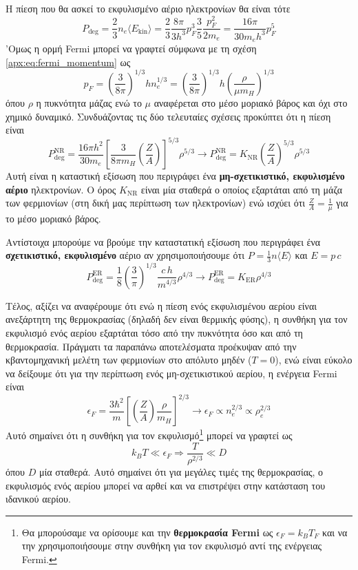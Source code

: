 Η πίεση που θα ασκεί το εκφυλισμένο αέριο ηλεκτρονίων θα είναι τότε
$$P_{\text{deg}} = \frac{2}{3} n_e \langle E_{\text{kin}} \rangle  = \frac{2}{3} \frac{8\pi}{3h^3} p_F^3 \frac{3}{5}\frac{p_F^2}{2m_e} = \frac{16\pi}{30m_e h^3}p_F^5$$
'Ομως η ορμή Fermi μπορεί να γραφτεί σύμφωνα με τη σχέση \eqref{apx:eq:fermi_momentum} ως
$$p_F = \left( \frac{3}{8\pi} \right)^{1/3} h n_e^{1/3} = \left(\frac{3}{8\pi} \right)^{1/3} h \left(\frac{\rho}{\mu m_H} \right)^{1/3}$$
όπου $\rho$ η πυκνότητα μάζας ενώ το $\mu$ αναφέρεται στο μέσο μοριακό βάρος και όχι στο χημικό δυναμικό. Συνδυάζοντας τις δύο τελευταίες σχέσεις προκύπτει ότι η πίεση είναι
\begin{equation}
    \label{apx:eq:degenerate_eos_nr}
    \boxed{P_{\text{deg}}^{\text{NR}} = \frac{16 \pi h^2}{30m_e} \left[ \frac{3}{8\pi m_H} \left(\frac{Z}{A} \right) \right]^{5/3} \rho^{5/3} \longrightarrow P_{\text{deg}}^{\text{NR}} = K_{\text{NR}} \left( \frac{Z}{A} \right)^{5/3} \rho^{5/3}}
\end{equation}
Αυτή είναι η καταστική εξίσωση που περιγράφει ένα \textbf{μη-σχετικιστικό, εκφυλισμένο αέριο} ηλεκτρονίων. Ο όρος $K_{\text{NR}}$ είναι μία σταθερά ο οποίος εξαρτάται από τη μάζα των φερμιονίων (στη δική μας περίπτωση των ηλεκτρονίων) ενώ ισχύει ότι $\frac{Z}{A} = \frac{1}{\mu}$ για το μέσο μοριακό βάρος.

Αντίστοιχα μπορούμε να βρούμε την καταστατική εξίσωση που περιγράφει ένα \textbf{σχετικιστικό, εκφυλισμένο} αέριο αν χρησιμοποιήσουμε ότι $P = \frac{1}{3}n \langle E \rangle$ και $E = p\,c$
\begin{equation}
    \label{apx:eq:degenerate_eos_er}
    \boxed{P_{\text{deg}}^{\text{ER}} = \frac{1}{8} \left( \frac{3}{\pi} \right)^{1/3} \frac{c\,h}{m^{4/3}} \rho^{4/3} \longrightarrow P_{\text{deg}}^{\text{ER}} = K_{\text{ER}} \rho^{4/3}}
\end{equation}

Τέλος, αξίζει να αναφέρουμε ότι ενώ η πίεση ενός εκφυλισμένου αερίου είναι ανεξάρτητη της θερμοκρασίας (δηλαδή δεν είναι θερμικής φύσης), η συνθήκη για τον εκφυλισμό ενός αερίου εξαρτάται τόσο από την πυκνότητα όσο και από τη θερμοκρασία. Πράγματι τα παραπάνω αποτελέσματα προέκυψαν από την κβαντομηχανική μελέτη των φερμιονίων στο απόλυτο μηδέν ($Τ=0$), ενώ είναι εύκολο να δείξουμε ότι για την περίπτωση ενός μη-σχετικιστικού αερίου, η ενέργεια Fermi είναι
$$\epsilon_F = \frac{3\hbar^2}{m} \left[\left( \frac{Z}{A} \right) \frac{\rho}{m_H} \right]^{2/3} \longrightarrow \epsilon_F \propto n_e^{2/3} \propto \rho_e^{2/3}$$
Αυτό σημαίνει ότι η συνθήκη για τον εκφυλισμό\footnote{Θα μπορούσαμε να ορίσουμε και την \textbf{θερμοκρασία Fermi} ως $\epsilon_F = k_B T_F$ και να την χρησιμοποιήσουμε στην συνθήκη για τον εκφυλισμό αντί της ενέργειας Fermi.} μπορεί να γραφτεί ως
$$k_B T \ll \epsilon_F \Rightarrow \frac{T}{\rho^{2/3}} \ll D$$
όπου $D$ μία σταθερά. Αυτό σημαίνει ότι για μεγάλες τιμές της θερμοκρασίας, ο εκφυλισμός ενός αερίου μπορεί να αρθεί και να επιστρέψει στην κατάσταση του ιδανικού αερίου.

